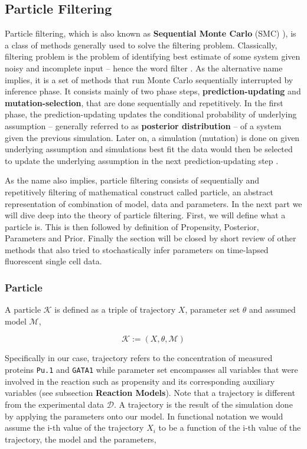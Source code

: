 \documentclass{bioinfo}
\begin{document}
\subsection{Particle Filtering}

Particle filtering, which is also known as \textbf{Sequential Monte Carlo} (SMC) \citep{Doucet01, Liu98}), is a class of methods generally used to solve the filtering problem. Classically, filtering problem is the problem of identifying best estimate of some system given noisy and incomplete input -- hence the word filter \citep{DelMoral96}. As the alternative name implies, it is a set of methods that run Monte Carlo sequentially interrupted by inference phase. It consists mainly of two phase steps, \textbf{prediction-updating} and \textbf{mutation-selection}, that are done sequentially and repetitively. In the first phase, the prediction-updating updates the conditional probability of underlying assumption -- generally referred to as \textbf{posterior distribution} -- of a system given the previous simulation. Later on, a simulation (mutation) is done on given underlying assumption and simulations best fit the data would then be selected to update the underlying assumption in the next prediction-updating step \citep{DelMoral12}.

As the name also implies, particle filtering consists of sequentially and repetitively filtering of mathematical construct called particle, an abstract representation of combination of model, data and parameters. In the next part we will dive deep into the theory of particle filtering. First, we will define what a particle is. This is then followed by definition of Propensity, Posterior, Parameters and Prior. Finally the section will be closed by short review of other methods that also tried to stochastically infer parameters on time-lapsed fluorescent single cell data.

\subsubsection{Particle}

A particle $\mathcal{K}$ is defined as a triple of trajectory $X$, parameter set $\theta$ and assumed model $\mathcal{M}$,

\begin{equation}
\mathcal{K} := (X, \theta, \mathcal{M})\label{eq:01}
\end{equation}

Specifically in our case, trajectory refers to the concentration of measured proteins \texttt{Pu.1} and \texttt{GATA1} while parameter set encompasses all variables that were involved in the reaction such as propensity and its corresponding auxiliary variables (see subsection \textbf{Reaction Models}). Note that a trajectory is different from the experimental data $\mathcal{D}$. A trajectory is the result of the simulation done by applying the parameters onto our model. In functional notation we would assume the i-th value of the trajectory $X_i$ to be a function of the i-th value of the trajectory, the model and the parameters,
\end{document}

